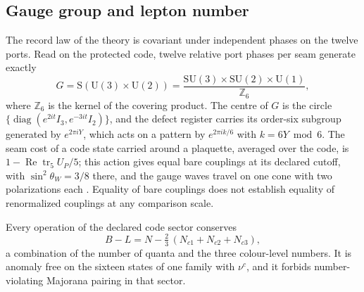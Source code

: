 \subsection{Gauge group and lepton number}

The record law of the theory is covariant under independent phases on the twelve ports. Read on the
protected code, twelve relative port phases per seam generate exactly
\[
 G=\mathrm S(\mathrm U(3)\times\mathrm U(2))
 =\frac{\mathrm{SU}(3)\times\mathrm{SU}(2)\times\mathrm U(1)}{\mathbb Z_6},
\]
where $\mathbb Z_6$ is the kernel of the covering product. The centre of $G$ is the circle
$\{\operatorname{diag}(e^{2it}I_3,e^{-3it}I_2)\}$, and the defect register carries its
order-six subgroup generated by $e^{2\pi iY}$, which acts on a pattern by $e^{2\pi ik/6}$
with $k=6Y\bmod6$. The seam cost of a code state
carried around a plaquette, averaged over the code, is $1-\operatorname{Re}\operatorname{tr}_5
U_P/5$; this action gives equal bare couplings at its declared cutoff, with
$\sin^2\theta_W=3/8$ there, and the gauge waves travel on one cone with two polarizations
each \cite{ophGauge}. Equality of bare couplings does
not establish equality of renormalized couplings at any comparison scale.

Every operation of the declared code sector conserves
\[
 B-L=N-\tfrac23\,(N_{c1}+N_{c2}+N_{c3}),
\]
a combination of the number of quanta and the three colour-level numbers. It is anomaly free
on the sixteen states of one family with $\nu^c$, and it forbids number-violating
Majorana pairing in that sector.
